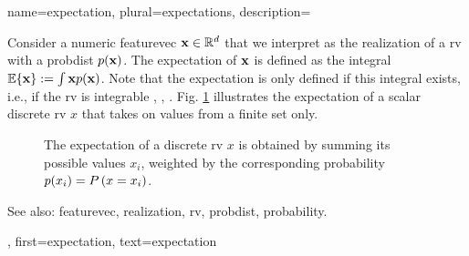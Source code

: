 {name={expectation}, plural={expectations},
  description={Consider a numeric \gls{featurevec} ${\bf x} \in \mathbb{R}^{d}$ 
	that we interpret as the \gls{realization} of a \gls{rv} with a \gls{probdist} $p({\bf x})$. 
	The expectation of ${\bf x}$ is defined as the integral $\mathbb{E} \{ {\bf x} \} := \int {\bf x} p({\bf x})$. 
	Note that the expectation is only defined if this integral exists, i.e., if the \gls{rv} is integrable 
	\cite{RudinBookPrinciplesMatheAnalysis}, \cite{BillingsleyProbMeasure}, \cite{HalmosMeasure}. 
	Fig. \ref{fig_expect_discrete_dict} illustrates the expectation of a scalar discrete \gls{rv} $x$ that takes on values 
	from a finite set only. 
   \begin{figure}[H]
   	\begin{center}
\end{center}
\vspace*{-5mm}
\caption{The expectation of a discrete \gls{rv} $x$ is obtained by summing its possible values $x_{i}$, weighted 
	by the corresponding \gls{probability} $p(x_i) = P\left(x= x_i\right)$. \label{fig_expect_discrete_dict}}
 \end{figure}
		See also: \gls{featurevec}, \gls{realization}, \gls{rv}, \gls{probdist}, \gls{probability}.},
first={expectation},
text={expectation}
}

